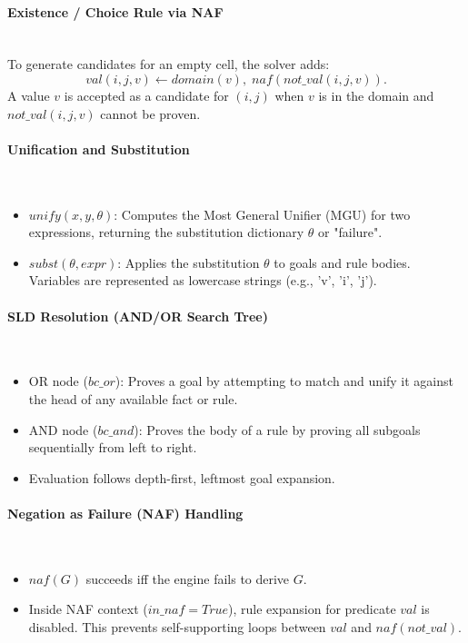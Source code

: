 \paragraph{Existence / Choice Rule via NAF}~\\
To generate candidates for an empty cell, the solver adds:
\[
val(i,j,v) \leftarrow domain(v),\; naf(not\_val(i,j,v)).
\]
A value $v$ is accepted as a candidate for $(i,j)$ when $v$ is in the domain and $not\_val(i,j,v)$ cannot be proven.



\paragraph{Unification and Substitution}~
\begin{itemize}
    \item $unify(x,y,\theta)$: Computes the Most General Unifier (MGU) for two expressions, returning the substitution dictionary $\theta$ or "failure".
    \item $subst(\theta, expr)$: Applies the substitution $\theta$ to goals and rule bodies. Variables are represented as lowercase strings (e.g., 'v', 'i', 'j').
\end{itemize}

\paragraph{SLD Resolution (AND/OR Search Tree)}~
\begin{itemize}
    \item OR node ($bc\_or$): Proves a goal by attempting to match and unify it against the head of any available fact or rule.
    \item AND node ($bc\_and$): Proves the body of a rule by proving all subgoals sequentially from left to right.
    \item Evaluation follows depth-first, leftmost goal expansion.
\end{itemize}

\paragraph{Negation as Failure (NAF) Handling}~
\begin{itemize}
    \item $naf(G)$ succeeds iff the engine fails to derive $G$.
    \item Inside NAF context ($in\_naf=True$), rule expansion for predicate $val$ is disabled. This prevents self-supporting loops between $val$ and $naf(not\_val)$.
\end{itemize}


